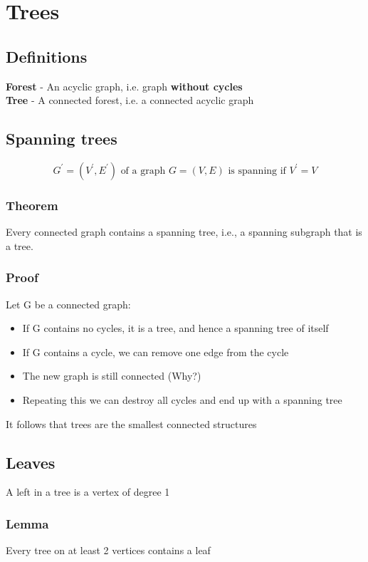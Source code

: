 \documentclass{article}[18pt]
\begin{document}
\section{Trees}
\subsection{Definitions}
\textbf{Forest} - An acyclic graph, i.e. graph \textbf{without cycles}\\
\textbf{Tree} - A connected forest, i.e. a connected acyclic graph
\subsection{Spanning trees}
$$G ^ { \prime } = \left( V ^ { \prime } , E ^ { \prime } \right) \text { of a graph } G = ( V , E ) \text { is spanning if } V ^ { \prime } = V$$
\subsubsection{Theorem}
Every connected graph contains a spanning tree, i.e., a spanning subgraph that is
a tree.
\subsubsection{Proof}
Let G be a connected graph:
\begin{itemize}
	\item If G contains no cycles, it is a tree, and hence a spanning tree of itself
	\item If G contains a cycle, we can remove one edge from the cycle
	\item The new graph is still connected (Why?)
	\item Repeating this we can destroy all cycles and end up with a spanning tree
\end{itemize}
It follows that trees are the smallest connected structures
\subsection{Leaves}
A left in a tree is a vertex of degree 1
\subsubsection{Lemma}
Every tree on at least 2 vertices contains a leaf
\end{document}
